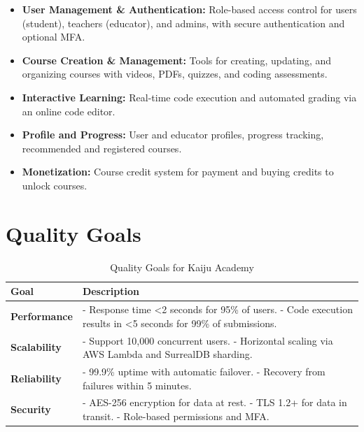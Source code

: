 \documentclass[a4paper, 11pt]{scrreprt}
\begin{document}
\begin{itemize}
    \item \textbf{User Management \& Authentication:} Role-based access control for users (student), teachers (educator), and admins, with secure authentication and optional MFA.
    \item \textbf{Course Creation \& Management:} Tools for creating, updating, and organizing courses with videos, PDFs, quizzes, and coding assessments.
    \item \textbf{Interactive Learning:} Real-time code execution and automated grading via an online code editor.
    \item \textbf{Profile and Progress:} User and educator profiles, progress tracking, recommended and registered courses.
    \item \textbf{Monetization:} Course credit system for payment and buying credits to unlock courses.
\end{itemize}

\section{Quality Goals}
\begin{table}[htp]
    \centering
    \begin{tabularx}{\textwidth}{|l|X|}
        \hline
        \textbf{Goal} & \textbf{Description} \\
        \hline
        \textbf{Performance} & - Response time <2 seconds for 95\% of users. \newline - Code execution results in <5 seconds for 99\% of submissions. \\
        \hline
        \textbf{Scalability} & - Support 10,000 concurrent users. \newline - Horizontal scaling via AWS Lambda and SurrealDB sharding. \\
        \hline
        \textbf{Reliability} & - 99.9\% uptime with automatic failover. \newline - Recovery from failures within 5 minutes. \\
        \hline
        \textbf{Security} & - AES-256 encryption for data at rest. \newline - TLS 1.2+ for data in transit. \newline - Role-based permissions and MFA. \\
        \hline
    \end{tabularx}
    \caption{Quality Goals for Kaiju Academy}
\end{table}
\end{document}
